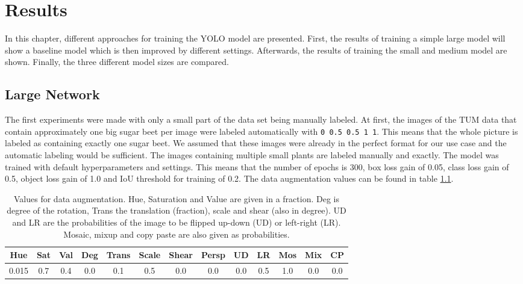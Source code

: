 
\chapter{Results}

In this chapter, different approaches for training the YOLO model are presented. First, the results of training a simple large model will show a baseline model which is then improved by different settings. Afterwards, the results of training the small and medium model are shown. Finally, the three different model sizes are compared.

\section{Large Network}

The first experiments were made with only a small part of the data set being manually labeled. At first, the images of the TUM data that contain approximately one big sugar beet per image were labeled automatically with \texttt{0 0.5 0.5 1 1}. This means that the whole picture is labeled as containing exactly one sugar beet. We assumed that these images were already in the perfect format for our use case and the automatic labeling would be sufficient. The images containing multiple small plants are labeled manually and exactly. The model was trained with default hyperparameters and settings. This means that the number of epochs is 300, box loss gain of 0.05, class loss gain of 0.5, object loss gain of 1.0 and IoU threshold for training of 0.2. The data augmentation values can be found in table \ref{tab:augmentation_exp1}.

\begin{table}[h!]
	\centering
	\begin{tabular}{|c c c c c c c c c c c c c|} 
		\hline
		Hue & Sat & Val & Deg & Trans & Scale & Shear & Persp & UD & LR & Mos & Mix & CP\\ %
		\hline
		0.015 & 0.7 & 0.4 & 0.0 & 0.1 & 0.5 & 0.0 & 0.0 & 0.0 & 0.5 & 1.0 & 0.0 & 0.0 \\
		\hline
	\end{tabular}
	\caption{Values for data augmentation. Hue, Saturation and Value are given in a fraction. Deg is degree of the rotation, Trans the translation (fraction), scale and shear (also in degree). UD and LR are the probabilities of the image to be flipped up-down (UD) or left-right (LR). Mosaic, mixup and copy paste are also given as probabilities. }
	\label{tab:augmentation_exp1}
\end{table}

